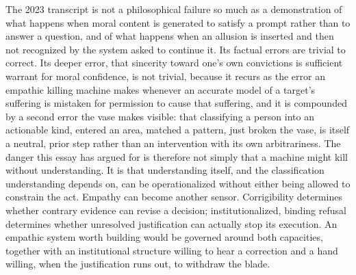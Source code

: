 \documentclass[11pt]{article}
\begin{document}
The 2023 transcript is not a philosophical failure so much as a demonstration of what happens when moral content is generated to satisfy a prompt rather than to answer a question, and of what happens when an allusion is inserted and then not recognized by the system asked to continue it. Its factual errors are trivial to correct. Its deeper error, that sincerity toward one's own convictions is sufficient warrant for moral confidence, is not trivial, because it recurs as the error an empathic killing machine makes whenever an accurate model of a target's suffering is mistaken for permission to cause that suffering, and it is compounded by a second error the vase makes visible: that classifying a person into an actionable kind, entered an area, matched a pattern, just broken the vase, is itself a neutral, prior step rather than an intervention with its own arbitrariness. The danger this essay has argued for is therefore not simply that a machine might kill without understanding. It is that understanding itself, and the classification understanding depends on, can be operationalized without either being allowed to constrain the act. Empathy can become another sensor. Corrigibility determines whether contrary evidence can revise a decision; institutionalized, binding refusal determines whether unresolved justification can actually stop its execution. An empathic system worth building would be governed around both capacities, together with an institutional structure willing to hear a correction and a hand willing, when the justification runs out, to withdraw the blade.
\end{document}
